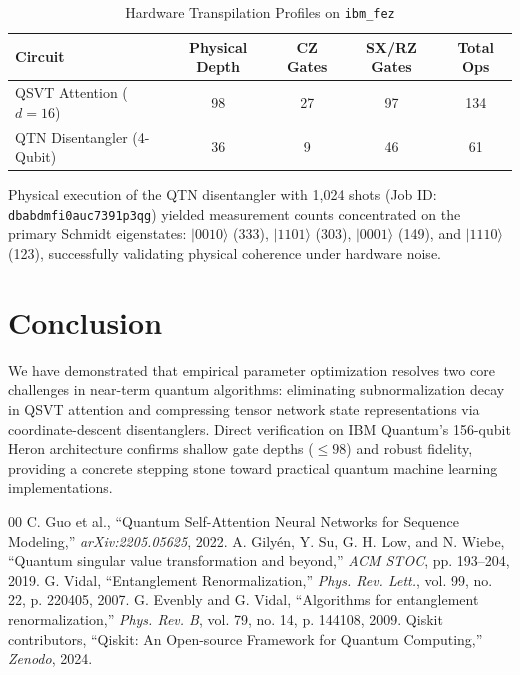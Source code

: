 \documentclass[conference]{IEEEtran}
\begin{document}
\begin{table}[htbp]
\caption{Hardware Transpilation Profiles on \texttt{ibm\_fez}}
\label{tab:hardware}
\begin{center}
\begin{tabular}{lcccc}
\toprule
\textbf{Circuit} & \textbf{Physical Depth} & \textbf{CZ Gates} & \textbf{SX/RZ Gates} & \textbf{Total Ops} \\
\midrule
QSVT Attention ($d=16$) & 98 & 27 & 97 & 134 \\
QTN Disentangler (4-Qubit) & 36 & 9 & 46 & 61 \\
\bottomrule
\end{tabular}
\end{center}
\end{table}

Physical execution of the QTN disentangler with 1,024 shots (Job ID: \texttt{dbabdmfi0auc7391p3qg}) yielded measurement counts concentrated on the primary Schmidt eigenstates: $|0010\rangle$ (333), $|1101\rangle$ (303), $|0001\rangle$ (149), and $|1110\rangle$ (123), successfully validating physical coherence under hardware noise.

\section{Conclusion}
We have demonstrated that empirical parameter optimization resolves two core challenges in near-term quantum algorithms: eliminating subnormalization decay in QSVT attention and compressing tensor network state representations via coordinate-descent disentanglers. Direct verification on IBM Quantum's 156-qubit Heron architecture confirms shallow gate depths ($\le 98$) and robust fidelity, providing a concrete stepping stone toward practical quantum machine learning implementations.

\begin{thebibliography}{00}
 C. Guo et al., ``Quantum Self-Attention Neural Networks for Sequence Modeling,'' \textit{arXiv:2205.05625}, 2022.
 A. Gily\'en, Y. Su, G. H. Low, and N. Wiebe, ``Quantum singular value transformation and beyond,'' \textit{ACM STOC}, pp. 193--204, 2019.
 G. Vidal, ``Entanglement Renormalization,'' \textit{Phys. Rev. Lett.}, vol. 99, no. 22, p. 220405, 2007.
 G. Evenbly and G. Vidal, ``Algorithms for entanglement renormalization,'' \textit{Phys. Rev. B}, vol. 79, no. 14, p. 144108, 2009.
 Qiskit contributors, ``Qiskit: An Open-source Framework for Quantum Computing,'' \textit{Zenodo}, 2024.
\end{thebibliography}
\end{document}
